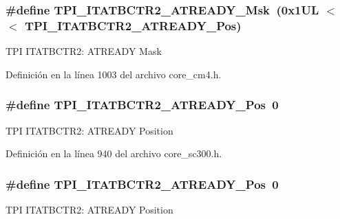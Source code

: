 \subsubsection[{\texorpdfstring{T\+P\+I\+\_\+\+I\+T\+A\+T\+B\+C\+T\+R2\+\_\+\+A\+T\+R\+E\+A\+D\+Y\+\_\+\+Msk}{TPI_ITATBCTR2_ATREADY_Msk}}]{\setlength{\rightskip}{0pt plus 5cm}\#define T\+P\+I\+\_\+\+I\+T\+A\+T\+B\+C\+T\+R2\+\_\+\+A\+T\+R\+E\+A\+D\+Y\+\_\+\+Msk~(0x1\+U\+L $<$$<$ T\+P\+I\+\_\+\+I\+T\+A\+T\+B\+C\+T\+R2\+\_\+\+A\+T\+R\+E\+A\+D\+Y\+\_\+\+Pos)}\hypertarget{group___c_m_s_i_s___t_p_i_ga1859502749709a2e5ead9a2599d998db}{}\label{group___c_m_s_i_s___t_p_i_ga1859502749709a2e5ead9a2599d998db}
T\+PI I\+T\+A\+T\+B\+C\+T\+R2\+: A\+T\+R\+E\+A\+DY Mask 

Definición en la línea 1003 del archivo core\+\_\+cm4.\+h.

\subsubsection[{\texorpdfstring{T\+P\+I\+\_\+\+I\+T\+A\+T\+B\+C\+T\+R2\+\_\+\+A\+T\+R\+E\+A\+D\+Y\+\_\+\+Pos}{TPI_ITATBCTR2_ATREADY_Pos}}]{\setlength{\rightskip}{0pt plus 5cm}\#define T\+P\+I\+\_\+\+I\+T\+A\+T\+B\+C\+T\+R2\+\_\+\+A\+T\+R\+E\+A\+D\+Y\+\_\+\+Pos~0}\hypertarget{group___c_m_s_i_s___t_p_i_ga6959f73d7db4a87ae9ad9cfc99844526}{}\label{group___c_m_s_i_s___t_p_i_ga6959f73d7db4a87ae9ad9cfc99844526}
T\+PI I\+T\+A\+T\+B\+C\+T\+R2\+: A\+T\+R\+E\+A\+DY Position 

Definición en la línea 940 del archivo core\+\_\+sc300.\+h.

\subsubsection[{\texorpdfstring{T\+P\+I\+\_\+\+I\+T\+A\+T\+B\+C\+T\+R2\+\_\+\+A\+T\+R\+E\+A\+D\+Y\+\_\+\+Pos}{TPI_ITATBCTR2_ATREADY_Pos}}]{\setlength{\rightskip}{0pt plus 5cm}\#define T\+P\+I\+\_\+\+I\+T\+A\+T\+B\+C\+T\+R2\+\_\+\+A\+T\+R\+E\+A\+D\+Y\+\_\+\+Pos~0}\hypertarget{group___c_m_s_i_s___t_p_i_ga6959f73d7db4a87ae9ad9cfc99844526}{}\label{group___c_m_s_i_s___t_p_i_ga6959f73d7db4a87ae9ad9cfc99844526}
T\+PI I\+T\+A\+T\+B\+C\+T\+R2\+: A\+T\+R\+E\+A\+DY Position 

